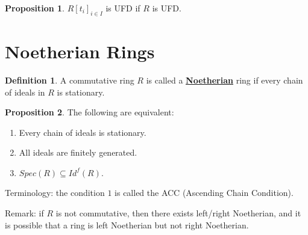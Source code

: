 \documentclass{article}
\theoremstyle{definition}
\theoremstyle{definition}
\theoremstyle{definition}
\newtheorem{proposition}{Proposition}[section]
\theoremstyle{definition}
\theoremstyle{definition}
\newtheorem{definition}{Definition}[section]
\theoremstyle{definition}
\theoremstyle{definition}
\begin{document}
\begin{tcolorbox}[colback=blue!5!white,colframe=blue!30!white]
\begin{proposition}
$R[t_i]_{i\in I}$ is UFD if $R$ is UFD.
\end{proposition}
\end{tcolorbox}

\section{Noetherian Rings}



\begin{tcolorbox}[colback=purple!5!white,colframe=purple!75!black]
\begin{definition}
A commutative ring $R$ is called a \underline{\textbf{Noetherian}} ring if every chain of ideals in $R$ is stationary.
\end{definition}
\end{tcolorbox}




\begin{tcolorbox}[colback=blue!5!white,colframe=blue!30!white]
\begin{proposition} The following are equivalent:
    \begin{enumerate}
        \item Every chain of ideals is stationary.
        \item All ideals are finitely generated.
        \item $Spec(R)\subseteq Id^f(R)$.    
    \end{enumerate}
    Terminology: the condition $1$ is called the ACC (Ascending Chain Condition).
\end{proposition}
\end{tcolorbox}

Remark: if $R$ is not commutative, then there exists left/right Noetherian, and it is possible that a ring is left Noetherian but not right Noetherian.
\end{document}
